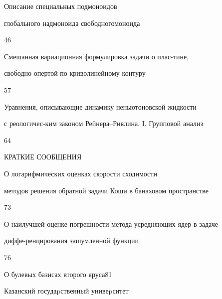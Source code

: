 

{Описание специальных подмоноидов


глобального надмоноида свободного\newline моноида}{46}




{Смешанная вариационная формулировка задачи о плас-\newline тине, 


свободно опертой по криволинейному контуру}{57} 




{Уравнения, описывающие динамику неньютоновской жидкости


с реологичес-\newline ким законом Рейнера--Ривлина. I. Групповой анализ}{64}


\bigskip





\begin{center}


КРАТКИЕ СООБЩЕНИЯ


\end{center}





\bigskip




{О логарифмических оценках скорости сходимости \newline


методов решения обратной задачи Коши в банаховом пространстве}{73}




{О наилучшей оценке погрешности метода усредняющих ядер в задаче


диффе-\newline ренцирования зашумленной функции}{76}




{О булевых базисах второго яруса}{81}











\vfill


\noindent\raisebox{2pt}{\copyright} Казанский госудаpственный унивеpситет





